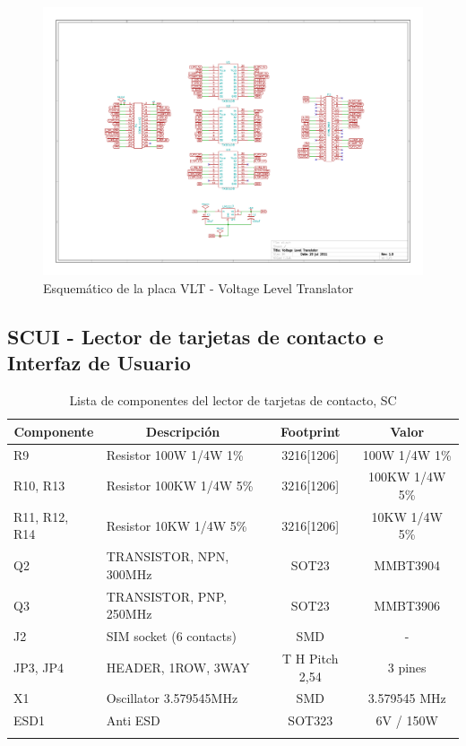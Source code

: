 \begin{figure}[H]
\centering
  \begin{center}
  \includegraphics[angle=90]{Imagenes/vlt.jpg}
  \end{center}
  \caption{Esquemático de la placa VLT - Voltage Level Translator}\label{Fig:VLT} 
\end{figure}

\subsection{SCUI - Lector de tarjetas de contacto e Interfaz de Usuario}
\begin{longtable}{|l|l|c|c|}
\hline
\multicolumn{1}{|c|}{\textbf{Componente}} & \multicolumn{1}{c|}{\textbf{Descripción}} & \textbf{ Footprint} & \textbf{Valor} \\ \hline
R9 & Resistor 100W 1/4W 1\%  & 3216[1206] & 100W 1/4W  1\% \\ \hline
R10, R13 & Resistor 100KW 1/4W 5\%  & 3216[1206] & 100KW 1/4W   5\% \\ \hline
R11, R12, R14 & Resistor 10KW 1/4W 5\%  & 3216[1206] & 10KW 1/4W   5\% \\ \hline
Q2 & TRANSISTOR, NPN, 300MHz & SOT23 & MMBT3904 \\ \hline
Q3 & TRANSISTOR, PNP, 250MHz & SOT23 & MMBT3906 \\ \hline
J2 & SIM socket (6 contacts) & SMD & - \\ \hline
JP3, JP4 & HEADER, 1ROW, 3WAY & T H Pitch 2,54 & 3 pines \\ \hline
X1 & Oscillator 3.579545MHz & SMD & 3.579545 MHz \\ \hline
ESD1 & Anti ESD & SOT323 & 6V / 150W \\ \hline
\caption{Lista de componentes del lector de tarjetas de contacto, SC}
\label{}
\end{longtable}

